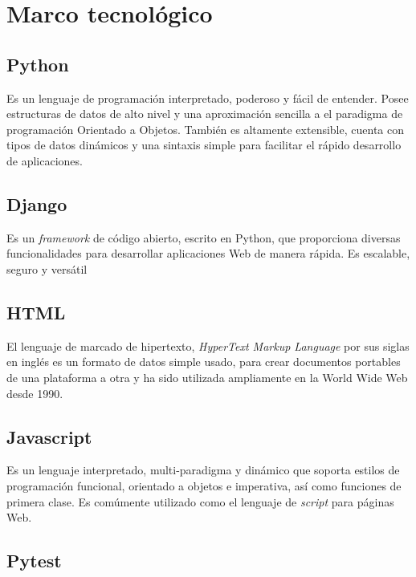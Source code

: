 \chapter{\textbf{Marco tecnológico}}
\thispagestyle{empty}

\section{Python}

Es un lenguaje de programación interpretado, poderoso y fácil de entender. Posee estructuras de datos de alto nivel y una aproximación sencilla a el paradigma de programación Orientado a Objetos. También es altamente extensible, cuenta con tipos de datos dinámicos y una sintaxis simple para facilitar el rápido desarrollo de aplicaciones. \citep{Python_tutorial}

\section{Django}

Es un \textit{framework} de código abierto, escrito en Python, que proporciona diversas funcionalidades para desarrollar aplicaciones Web de manera rápida. Es escalable, seguro y versátil 

\section{HTML}

El lenguaje de marcado de hipertexto, \textit{HyperText Markup Language} por sus siglas en inglés es un formato de datos simple usado, para crear documentos portables de una plataforma a otra y ha sido utilizada ampliamente en la World Wide Web desde 1990. \citep{RFC1866}

\section{Javascript}

Es un lenguaje interpretado, multi-paradigma y dinámico que soporta estilos de programación funcional,  orientado a objetos e imperativa, así como funciones de primera clase. Es comúmente utilizado como el lenguaje de \textit{script} para páginas Web. \citep{javascript}

\section{Pytest}

